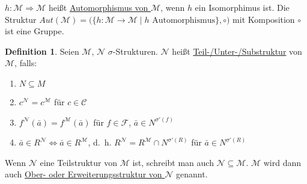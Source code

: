 \documentclass{article}
\theoremstyle{definition}
\newtheorem{dfn}{Definition}
\newcommand{\calC}{\mathcal{C}}
\newcommand{\calF}{\mathcal{F}}
\newcommand{\calM}{\mathcal{M}}
\newcommand{\calN}{\mathcal{N}}
\begin{document}
    $ h : \calM \Rightarrow \calM $ heißt \underline{Automorphismus von $ \calM $}, wenn $ h $ ein Isomorphimus ist.
    Die Struktur $ Aut(\calM) = \big( \{ h : \calM \rightarrow \calM \mid h \text{ Automorphismus} \}, \circ \big) $ mit Komposition $ \circ $ ist eine Gruppe.

    \begin{dfn}
        Seien $ \calM $, $ \calN $ $\sigma $-Strukturen.
        $ \calN $ heißt \underline{Teil-/Unter-/Substruktur} von $ \calM $, falls:
        \begin{enumerate}
            \item $ N \subseteq M $
            \item $ c^\calN = c^\calM $ für $ c \in \calC $
            \item $ f^\calN(\bar{a}) = f^\calM(\bar{a}) $ für $ f \in \calF $, $ \bar{a} \in N^{\sigma'(f)} $
            \item $ \bar{a} \in R^\calN \Leftrightarrow \bar{a} \in R^\calM $, d.~h. $ R^\calN = R^\calM \cap N^{\sigma'(R)} $ für $ \bar{a} \in N^{\sigma'(R)} $
        \end{enumerate}
    \end{dfn}

    Wenn $ \calN $ eine Teilstruktur von $ \calM $ ist, schreibt man auch $ \calN \subseteq \calM $.
    $ \calM $ wird dann auch \underline{Ober- oder Erweiterungsstruktur von $ \calN $} genannt.
\end{document}
